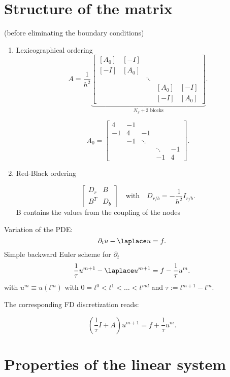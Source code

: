 \section{Structure of the matrix}%
\label{sec:Structure of the matrix}
(before eliminating the boundary conditions)
\begin{enumerate}[label=\alph{enumi})]
	\item Lexicographical ordering
		\[
		A= \frac{1}{h^{2}}
		\underbrace{
		\begin{bmatrix}
			[A_{0}] & [-I] &&& \\
			[-I] & [A_0] &&&\\
				 &&\ddots && \\
				 &&& [A_0] & [-I] \\
				 &&& [-I]& [A_0]
		\end{bmatrix}
		}_{N_{x}+2 \text{ blocks}}
		.\] 

		\[
		A_0 = \begin{bmatrix}
			4 & -1 &&& \\
			-1 & 4 & -1 && \\
			 & -1 & \ddots && \\
			 &&&\ddots & -1 \\
			 &&&-1 & 4
		\end{bmatrix}
		.\] 
	\item Red-Black ordering

		\[
			\begin{bmatrix}
				D_{r} & B \\
				B^{T} & D_{b}
			\end{bmatrix}
			\quad \text{with}\quad D_{r/b}=-\frac{1}{h^{2}}I_{r/b}
		.\] 
		B contains the values from the coupling of the nodes
\end{enumerate}

Variation of the PDE:
\[
\partial_{t}u- \laplace u=f
.\] 
Simple backward Euler scheme for $\partial_{t}$
\[
\frac{1}{\tau}u^{m+1}- \laplace u^{m+1} = f -\frac{1}{\tau}u^{m}
.\] 
with $u^{m} \equiv u(t^{m})$ with $0=t^{0}<t^{1}< \ldots  < t^{md}$ and $\tau:=t^{m+1}-t^{m}$.

The corresponding FD discretization reads:

\[
	\left(\frac{1}{\tau}I + A\right) u^{m+1} = f + \frac{1}{\tau}u^{m}
.\] 

\section{Properties of the linear system}%
\label{sec:Properties of the linear system}

